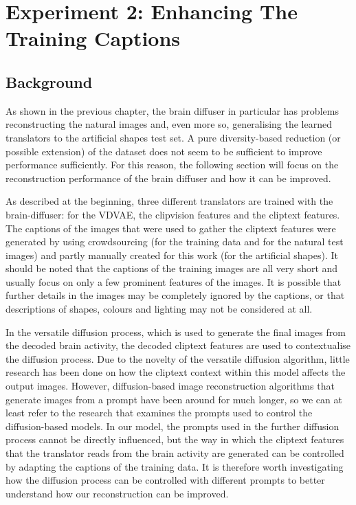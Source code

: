 \section{Experiment 2: Enhancing The Training Captions}

\subsection{Background}

As shown in the previous chapter, the brain diffuser in particular has problems reconstructing the natural images and, even more so, generalising the learned translators to the artificial shapes test set. A pure diversity-based reduction (or possible extension) of the dataset does not seem to be sufficient to improve performance sufficiently. For this reason, the following section will focus on the reconstruction performance of the brain diffuser and how it can be improved. 

As described at the beginning, three different translators are trained with the brain-diffuser: for the VDVAE, the clipvision features and the cliptext features. The captions of the images that were used to gather the cliptext features were generated by using crowdsourcing (for the training data and for the natural test images) and partly manually created for this work (for the artificial shapes). It should be noted that the captions of the training images are all very short and usually focus on only a few prominent features of the images. It is possible that further details in the images may be completely ignored by the captions, or that descriptions of shapes, colours and lighting may not be considered at all.

In the versatile diffusion process, which is used to generate the final images from the decoded brain activity, the decoded cliptext features are used to contextualise the diffusion process\cite{ozcelikNaturalSceneReconstruction2023,xuVersatileDiffusionText2024}. Due to the novelty of the versatile diffusion algorithm, little research has been done on how the cliptext context within this model affects the output images. However, diffusion-based image reconstruction algorithms that generate images from a prompt have been around for much longer\cite{rombachHighResolutionImageSynthesis2022,sahariaPhotorealisticTexttoimageDiffusion2022}, so we can at least refer to the research that examines the prompts used to control the diffusion-based models. In our model, the prompts used in the further diffusion process cannot be directly influenced, but the way in which the cliptext features that the translator reads from the brain activity are generated can be controlled by adapting the captions of the training data. It is therefore worth investigating how the diffusion process can be controlled with different prompts to better understand how our reconstruction can be improved. 

